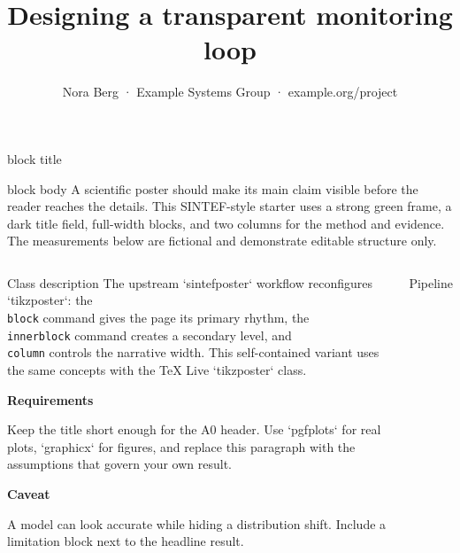 \documentclass[final]{beamer}
\title{Designing a transparent monitoring loop}
\author{Nora Berg · Example Systems Group · example.org/project}
\begin{document}
\begin{frame}[t]
\begin{beamercolorbox}[wd=\paperwidth,sep=1.5em,leftskip=2em,rightskip=2em]{block title}
  {\fontsize{43}{50}\selectfont\bfseries\inserttitle}\par\vspace{0.25em}
  {\Large\insertauthor}
\end{beamercolorbox}
\vspace{1.1em}
\begin{beamercolorbox}[wd=0.96\paperwidth,sep=0.9em]{block body}
  A scientific poster should make its main claim visible before the reader
  reaches the details. This SINTEF-style starter uses a strong green frame,
  a dark title field, full-width blocks, and two columns for the method and
  evidence. The measurements below are fictional and demonstrate editable
  structure only.
\end{beamercolorbox}
\begin{columns}
\column{0.47\paperwidth}
\begin{block}{Class description}
  The upstream `sintefposter` workflow reconfigures `tikzposter`: the
  \texttt{\\block} command gives the page its primary rhythm, the
  \texttt{\\innerblock} command creates a secondary level, and
  \texttt{\\column} controls the narrative width. This self-contained variant
  uses the same concepts with the TeX Live `tikzposter` class.
  \par\medskip\textbf{\color{sintefgreen}Requirements}\par
    Keep the title short enough for the A0 header. Use `pgfplots` for real
    plots, `graphicx` for figures, and replace this paragraph with the
    assumptions that govern your own result.
  \par\medskip\textbf{\color{sintefgreen}Caveat}\par
    A model can look accurate while hiding a distribution shift. Include a
    limitation block next to the headline result.
\end{block}
\begin{block}{Pipeline}
  \centering
\end{block}
\end{columns}
\end{frame}
\end{document}
